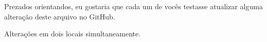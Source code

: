 \documentclass{article}
\begin{document}
Prezados orientandos,
eu gostaria que cada um de vocês testasse atualizar alguma alteração deste arquivo no GitHub.

Alterações
em dois 
locais simultaneamente.
\end{document}
